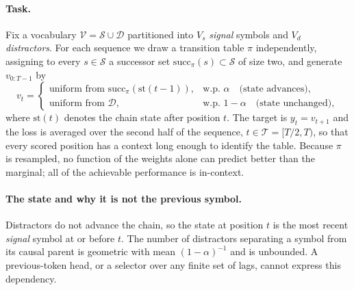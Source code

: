 \paragraph{Task.}
Fix a vocabulary $\mathcal{V}=\mathcal{S}\cup\mathcal{D}$ partitioned into $V_s$ \emph{signal}
symbols and $V_d$ \emph{distractors}. For each sequence we draw a transition table $\pi$
independently, assigning to every $s\in\mathcal{S}$ a successor set
$\mathrm{succ}_\pi(s)\subset\mathcal{S}$ of size two, and generate $v_{0:T-1}$ by
\begin{equation}
v_t=\begin{cases}
\text{uniform from }\mathrm{succ}_\pi(\mathrm{st}(t\!-\!1)), & \text{w.p. }\alpha
\quad\text{(state advances)},\\[2pt]
\text{uniform from }\mathcal{D}, & \text{w.p. }1-\alpha
\quad\text{(state unchanged)},
\end{cases}
\end{equation}
where $\mathrm{st}(t)$ denotes the chain state after position $t$. The target is
$y_t=v_{t+1}$ and the loss is averaged over the second half of the sequence,
$t\in\mathcal{T}=[T/2,T)$, so that every scored position has a context long enough to identify
the table. Because $\pi$ is resampled, no function of the weights alone can predict better than
the marginal; all of the achievable performance is in-context.

\paragraph{The state and why it is not the previous symbol.}
Distractors do not advance the chain, so the state at position $t$ is the most recent
\emph{signal} symbol at or before $t$. The number of distractors separating a symbol from its
causal parent is geometric with mean $(1-\alpha)^{-1}$ and is unbounded. A previous-token head,
or a selector over any finite set of lags, cannot express this dependency.

